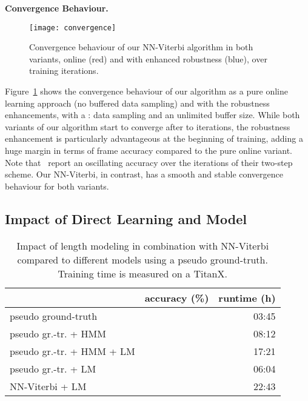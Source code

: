 \documentclass[10pt,twocolumn,letterpaper]{article}
\begin{document}
\textbf{Convergence Behaviour.}
\begin{figure}[tb]
    \centering
    \texttt{[image: convergence]}
    \caption{Convergence behaviour of our NN-Viterbi algorithm in both
             variants, online (red) and with enhanced robustness (blue), over  training iterations.}
    \label{fig:convergence}
    \vspace{-0.5cm}
\end{figure}
Figure~\ref{fig:convergence} shows the convergence behaviour of our algorithm
as a pure online learning approach (no buffered data sampling) and with the robustness enhancements,
\ie with a : data sampling and an unlimited buffer size.
While both variants of our algorithm start to converge after  to 
iterations, the robustness enhancement is particularly advantageous at the beginning
of training, adding a huge margin in terms of frame accuracy compared to the pure
online variant. Note that~\cite{richard2017weakly} report an oscillating accuracy
over the iterations of their two-step scheme. Our NN-Viterbi, in contrast, has a
smooth and stable convergence behaviour for both variants.


\subsection{Impact of Direct Learning and Model}
\label{sec:ablation}

\begin{table}
    \footnotesize
    \begin{tabularx}{0.48\textwidth}{Xrr}
        \toprule
                                                               & accuracy (\%) & runtime (h) \\
        \midrule
            pseudo ground-truth~\cite{richard2017weakly}       &  & 03:45 \\
            pseudo gr.-tr. + HMM~\cite{richard2017weakly}      &  & 08:12 \\
            pseudo gr.-tr. + HMM + LM                          &  & 17:21 \\
            pseudo gr.-tr. + LM                                &  & 06:04 \\
            NN-Viterbi + LM                                    &  & 22:43 \\
        \bottomrule
    \end{tabularx}
    \caption{Impact of length modeling in combination with NN-Viterbi compared
             to different models using a pseudo ground-truth. Training time is measured on a TitanX.}
    \label{tab:ablation}
    \vspace{-0.5cm}
\end{table}
\end{document}
